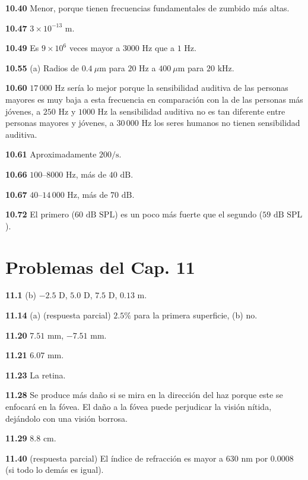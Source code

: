 \documentclass[12pt,a4paper]{book}
\begin{document}
\noindent \textbf{10.40} Menor, porque tienen frecuencias fundamentales de zumbido más altas.

\noindent \textbf{10.47} $3 \times 10^{-13}\text{ m}$.

\noindent \textbf{10.49} Es $9 \times 10^6$ veces mayor a $3000\text{ Hz}$ que a $1\text{ Hz}$.

\noindent \textbf{10.55} (a) Radios de $0.4\ \mu\text{m}$ para $20\text{ Hz}$ a $400\ \mu\text{m}$ para $20\text{ kHz}$.

\noindent \textbf{10.60} $17\,000\text{ Hz}$ sería lo mejor porque la sensibilidad auditiva de las personas mayores es muy baja a esta frecuencia en comparación con la de las personas más jóvenes, a $250\text{ Hz}$ y $1000\text{ Hz}$ la sensibilidad auditiva no es tan diferente entre personas mayores y jóvenes, a $30\,000\text{ Hz}$ los seres humanos no tienen sensibilidad auditiva.

\noindent \textbf{10.61} Aproximadamente $200/\text{s}$.

\noindent \textbf{10.66} $100\text{--}8000\text{ Hz}$, más de $40\text{ dB}$.

\noindent \textbf{10.67} $40\text{--}14\,000\text{ Hz}$, más de $70\text{ dB}$.

\noindent \textbf{10.72} El primero ($60\text{ dB SPL}$) es un poco más fuerte que el segundo ($59\text{ dB SPL}$).

\section*{Problemas del Cap. 11}

\noindent \textbf{11.1} (b) $-2.5\text{ D}$, $5.0\text{ D}$, $7.5\text{ D}$, $0.13\text{ m}$.

\noindent \textbf{11.14} (a) (respuesta parcial) $2.5\%$ para la primera superficie, (b) no.

\noindent \textbf{11.20} $7.51\text{ mm}$, $-7.51\text{ mm}$.

\noindent \textbf{11.21} $6.07\text{ mm}$.

\noindent \textbf{11.23} La retina.

\noindent \textbf{11.28} Se produce más daño si se mira en la dirección del haz porque este se enfocará en la fóvea. El daño a la fóvea puede perjudicar la visión nítida, dejándolo con una visión borrosa.

\noindent \textbf{11.29} $8.8\text{ cm}$.

\noindent \textbf{11.40} (respuesta parcial) El índice de refracción es mayor a $630\text{ nm}$ por $0.0008$ (si todo lo demás es igual).
\end{document}
